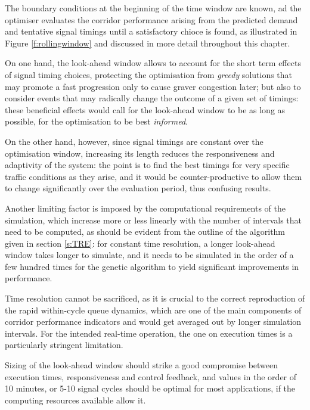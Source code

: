 The boundary conditions at the beginning of the time window are known, ad the optimiser evaluates the corridor performance arising from the predicted demand and tentative signal timings until a satisfactory chioce is found, as illustrated in Figure \ref{f:rollingwindow} and discussed in more detail throughout this chapter.

On one hand, the look-ahead window allows to account for the short term effects of signal timing choices, protecting the optimisation from \emph{greedy} solutions that may promote a fast progression only to cause graver congestion later; but also to consider events that may radically change the outcome of a given set of timings: these beneficial effects would call for the look-ahead window to be as long as possible, for the optimisation to be best \emph{informed}.

On the other hand, however, since signal timings are constant over the optimisation window, increasing its length reduces the responsiveness and adaptivity of the system: the point is to find the best timings for very specific traffic conditions as they arise, and it would be counter-productive to allow them to change significantly over the evaluation period, thus confusing results.

Another limiting factor is imposed by the computational requirements of the simulation, which increase more or less linearly with the number of intervals that need to be computed, as should be evident from the outline of the algorithm given in section \ref{s:TRE}: for constant time resolution, a longer look-ahead window takes longer to simulate, and it needs to be simulated in the order of a few hundred times for the genetic algorithm to yield significant improvements in performance. 

Time resolution cannot be sacrificed, as it is crucial to the correct reproduction of the rapid within-cycle queue dynamics, which are one of the main components of corridor performance indicators and would get averaged out by longer simulation intervals. For the intended real-time operation, the one on execution times is a particularly stringent limitation.

Sizing of the look-ahead window should strike a good compromise between execution times, responsiveness and control feedback, and values in the order of 10 minutes, or 5-10 signal cycles should be optimal for most applications, if the computing resources available allow it.

